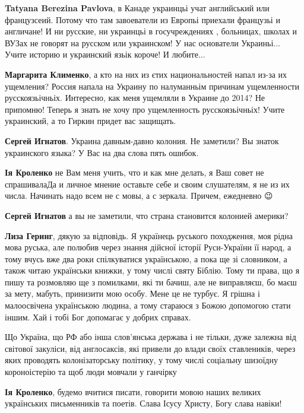 \begin{itemize}
\begin{itemize}
\textbf{Tatyana Berezina Pavlova}, в Канаде украинцьі учат английський или
французсеий. Потому что там завоеватели из Европьі приехали французьі и
англичане! И ни русские, ни украинцьі в госучреждениях , больницах, школах и
ВУЗах не говорят на русском или украинском! У нас основатели Украиньі... Учите
историю и украинский язьік короче! И любите...

\textbf{Маргарита Клименко}, а кто на них из єтих национальностей напал из-за
их ущемления? Россия напала на Украину по налуманньім причинам ущемленности
русскоязьічньіх. Интересно, как меня ущемляли в Украине до 2014? Не припомню!
Теперь я знать не хочу про ущемленность русскоязьічньіх! Учите украинский, а то
Гиркин придет вас защищать.

\textbf{Сергей Игнатов}. Украина давным-давно колония. Не заметили? Вы знаток украинского языка? У Вас на два слова пять ошибок.

\textbf{Ія Кроленко} не Вам меня учить, что и как мне делать, я Ваш совет не
спрашивала\Laughey[1.0] Да и личное мнение оставьте себе и своим слушателям, я не из их
числа. Начинать надо всем не с мовы, а с зеркала. Причем, ежедневно 😉

\textbf{Сергей Игнатов} а вы не заметили, что страна становится колонией америки?

\textbf{Лиза Геринг}, дякую за відповідь. Я українець руського походження, моя
рідна мова руська, але полюбив через знання дійсної історії Руси-України її
народ, а тому вчусь вже два роки спілкуватися українською, а пока ще зі
словником, а також читаю українськи книжки, у тому числі святу Біблію. Тому ти
права, що я пишу та розмовляю ще з помилками, які ти бачиш, але не виправляєш,
бо маєш за мету, мабуть, принизити мою особу. Мене це не турбує. Я грішна і
малоосвічена українською людина, а тому стараюся з Божою допомогою стати іншим.
Хай і тобі Бог допомагає у добрих справах.

Що Україна, що РФ або інша слов'янська держава і не тільки, дуже залежна від
світової закуліси, від англосаксів, які привели до влади своїх ставлеників,
через яких проводять колонізаторську політику, у тому числі соціальну шизоїдну
короноістерію та щоб люди мовчали у ганчірку

\textbf{Ія Кроленко}, будемо вчитися писати, говорити мовою наших великих
українських письменників та поетів. Слава Ісусу Христу, Богу слава навіки!


\end{itemize}
\end{itemize}
